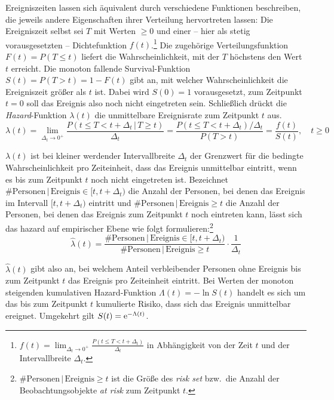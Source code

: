 Ereigniszeiten lassen sich äquivalent durch verschiedene Funktionen beschreiben, die jeweils andere Eigenschaften ihrer Verteilung hervortreten lassen: Die Ereigniszeit selbst sei $T$ mit Werten $\geq 0$ und einer -- hier als stetig vorausgesetzten -- Dichtefunktion $f(t)$.\footnote{$f(t) = \lim_{\Delta_{t} \to 0^{+}} \frac{P(t \leq T < t + \Delta_{t})}{\Delta_{t}}$ in Abhängigkeit von der Zeit $t$ und der Intervallbreite $\Delta_{t}$.} Die zugehörige Verteilungsfunktion $F(t) = P(T \leq t)$ liefert die Wahrscheinlichkeit, mit der $T$ höchstens den Wert $t$ erreicht. Die monoton fallende Survival-Funktion $S(t) = P(T > t) = 1-F(t)$ gibt an, mit welcher Wahrscheinlichkeit die Ereigniszeit größer als $t$ ist. Dabei wird $S(0) = 1$ vorausgesetzt, zum Zeitpunkt $t = 0$ soll das Ereignis also noch nicht eingetreten sein. Schließlich drückt die \emph{Hazard}-Funktion $\lambda(t)$ die unmittelbare Ereignisrate zum Zeitpunkt $t$ aus.
\begin{equation*}
\lambda(t) = \lim_{\Delta_{t} \to 0^{+}} \frac{P(t \leq T < t + \Delta_{t} \, | \, T \geq t)}{\Delta_{t}} = \frac{P(t \leq T < t + \Delta_{t}) / \Delta_{t}}{P(T > t)} = \frac{f(t)}{S(t)}, \quad t \geq 0
\end{equation*}

$\lambda(t)$ ist bei kleiner werdender Intervallbreite $\Delta_{t}$ der Grenzwert für die bedingte Wahrscheinlichkeit pro Zeiteinheit, dass das Ereignis unmittelbar eintritt, wenn es bis zum Zeitpunkt $t$ noch nicht eingetreten ist. Bezeichnet $\# \text{Personen} \, | \, \text{Ereignis} \in [t, t + \Delta_{t})$ die Anzahl der Personen, bei denen das Ereignis im Intervall $[t, t + \Delta_{t})$ eintritt und $\# \text{Personen} \, | \, \text{Ereignis} \geq t$ die Anzahl der Personen, bei denen das Ereignis zum Zeitpunkt $t$ noch eintreten kann, lässt sich das hazard auf empirischer Ebene wie folgt formulieren:\footnote{$\# \text{Personen} \, | \, \text{Ereignis} \geq t$ ist die Größe des \emph{risk set} bzw.\ die Anzahl der Beobachtungsobjekte \emph{at risk} zum Zeitpunkt $t$.}
\begin{equation*}
\hat{\lambda}(t) = \frac{\# \text{Personen} \, | \, \text{Ereignis} \in [t, t+\Delta_{t})}{\# \text{Personen} \, | \, \text{Ereignis} \geq t} \cdot \frac{1}{\Delta_{t}}
\end{equation*}

$\hat{\lambda}(t)$ gibt also an, bei welchem Anteil verbleibender Personen ohne Ereignis bis zum Zeitpunkt $t$ das Ereignis pro Zeiteinheit eintritt. Bei Werten der monoton steigenden kumulativen Hazard-Funktion $\Lambda(t) = -\ln S(t)$ handelt es sich um das bis zum Zeitpunkt $t$ kumulierte Risiko, dass sich das Ereignis unmittelbar ereignet. Umgekehrt gilt $S(t) = {\mathrm{e}}^{-\Lambda(t)}$.


